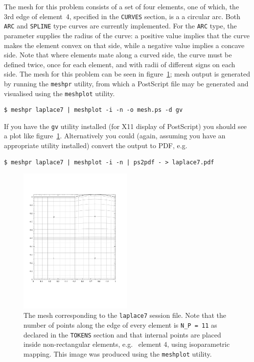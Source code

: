 \documentclass[11pt]{report}
\newcommand{\eg}{e.g.\ } \newcommand{\CC}{\mathrm{c.c.}}
\begin{document}
The mesh for this problem consists of a set of four elements, one of
which, the 3rd edge of element~4, specified in the \texttt{CURVES}
section, is a a circular arc.  Both \texttt{ARC} and \texttt{SPLINE}
type curves are currently implemented.  For the \texttt{ARC} type, the
parameter supplies the radius of the curve: a positive value implies
that the curve makes the element convex on that side, while a negative
value implies a concave side.  Note that where elements mate along a
curved side, the curve must be defined twice, once for each element,
and with radii of different signs on each side.  The mesh for this
problem can be seen in figure~\ref{lapcurve}; mesh output is generated
by running the \verb|meshpr| utility, from which a PostScript file may
be generated and visualised using the \verb|meshplot| utility.
%
{\small
\begin{verbatim}
$ meshpr laplace7 | meshplot -i -n -o mesh.ps -d gv
\end{verbatim}
} \noindent If you have the \verb|gv| utility installed (for X11
display of PostScript) you should see a plot like
figure~\ref{lapcurve}.  Alternatively you could (again, assuming you
have an appropriate utility installed) convert the output to PDF, \eg
%
{\small
\begin{verbatim}
$ meshpr laplace7 | meshplot -i -n | ps2pdf - > laplace7.pdf
\end{verbatim}
}
\begin{figure}
\begin{center}
\includegraphics[width=0.5\textwidth]{laplace6}
\end{center}
\caption{
\label{lapcurve}
  The mesh corresponding to the \texttt{laplace7} session file.  Note
  that the number of points along the edge of every element is
  \texttt{N\_P = 11} as declared in the \texttt{TOKENS} section and
  that internal points are placed inside non-rectangular elements, \eg
  element 4, using isoparametric mapping. This image was produced
  using the \texttt{meshplot} utility.}
\end{figure}
\end{document}
